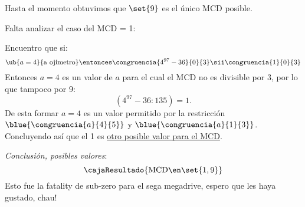\bigskip

Hasta el momento obtuvimos que $\set{9}$ es el único MCD posible.

Falta analizar el caso del MCD = 1:

Encuentro que si:
$$
  \ub{a = 4}{\text{a ojímetro}}
  \entonces
  \congruencia{4^{97} - 36}{0}{3}
  \sii
  \congruencia{1}{0}{3}
$$
Entonces $a = 4$ es un valor de $a$ para el cual el MCD no es divisible por 3, por lo que tampoco por 9:
$$
  (4^{97} -36 : 135) = 1.
$$
De esta formar $a = 4$ es un valor permitido por la restricción $\blue{\congruencia{a}{4}{5}}$ y $\blue{\congruencia{a}{1}{3}}$.
Concluyendo así que el 1 es \underline{otro posible valor para el MCD}.

\bigskip

\textit{Conclusión, posibles valores}:
$$
  \cajaResultado{
    \text{MCD} \en \set{1, 9}
  }
$$
{
    \tiny
    \color{black!20!white}
    Esto fue la fatality de sub-zero para el sega megadrive, espero que les haya gustado, chau!
  }

\begin{aportes}
  \item {}
  \item {}
\end{aportes}
